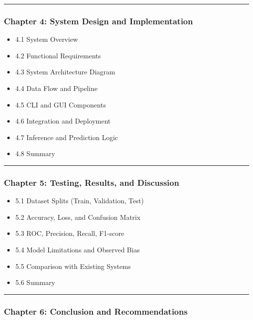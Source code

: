 \documentclass[
  12pt,
  oneside]{article}
\providecommand{\tightlist}{%
  \setlength{\itemsep}{0pt}\setlength{\parskip}{0pt}}
\begin{document}
\begin{center}\rule{0.5\linewidth}{0.5pt}\end{center}

\subsubsection{Chapter 4: System Design and
Implementation}\label{chapter-4-system-design-and-implementation}

\begin{itemize}
\tightlist
\item
  4.1 System Overview
\item
  4.2 Functional Requirements
\item
  4.3 System Architecture Diagram
\item
  4.4 Data Flow and Pipeline
\item
  4.5 CLI and GUI Components
\item
  4.6 Integration and Deployment
\item
  4.7 Inference and Prediction Logic
\item
  4.8 Summary
\end{itemize}

\begin{center}\rule{0.5\linewidth}{0.5pt}\end{center}

\subsubsection{Chapter 5: Testing, Results, and
Discussion}\label{chapter-5-testing-results-and-discussion}

\begin{itemize}
\tightlist
\item
  5.1 Dataset Splits (Train, Validation, Test)
\item
  5.2 Accuracy, Loss, and Confusion Matrix
\item
  5.3 ROC, Precision, Recall, F1-score
\item
  5.4 Model Limitations and Observed Bias
\item
  5.5 Comparison with Existing Systems
\item
  5.6 Summary
\end{itemize}

\begin{center}\rule{0.5\linewidth}{0.5pt}\end{center}

\subsubsection{Chapter 6: Conclusion and
Recommendations}\label{chapter-6-conclusion-and-recommendations}
\end{document}
